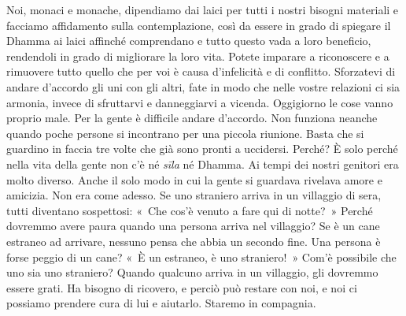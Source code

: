 Noi, monaci e monache, dipendiamo dai laici per tutti i nostri bisogni
materiali e facciamo affidamento sulla contemplazione, così da essere in
grado di spiegare il Dhamma ai laici affinché comprendano e tutto questo
vada a loro beneficio, rendendoli in grado di migliorare la loro vita.
Potete imparare a riconoscere e a rimuovere tutto quello che per voi è
causa d'infelicità e di conflitto. Sforzatevi di andare d'accordo gli
uni con gli altri, fate in modo che nelle vostre relazioni ci sia
armonia, invece di sfruttarvi e danneggiarvi a vicenda. Oggigiorno le
cose vanno proprio male. Per la gente è difficile andare d'accordo. Non
funziona neanche quando poche persone si incontrano per una piccola
riunione. Basta che si guardino in faccia tre volte che già sono pronti
a uccidersi. Perché? È solo perché nella vita della gente non c'è né
\emph{sīla} né Dhamma. Ai tempi dei nostri genitori era molto diverso.
Anche il solo modo in cui la gente si guardava rivelava amore e
amicizia. Non era come adesso. Se uno straniero arriva in un villaggio
di sera, tutti diventano sospettosi: «~Che cos'è venuto a fare qui di
notte?~» Perché dovremmo avere paura quando una persona arriva nel
villaggio? Se è un cane estraneo ad arrivare, nessuno pensa che abbia un
secondo fine. Una persona è forse peggio di un cane? «~È un estraneo, è
uno straniero!~» Com'è possibile che uno sia uno straniero? Quando
qualcuno arriva in un villaggio, gli dovremmo essere grati. Ha bisogno
di ricovero, e perciò può restare con noi, e noi ci possiamo prendere
cura di lui e aiutarlo. Staremo in compagnia.


